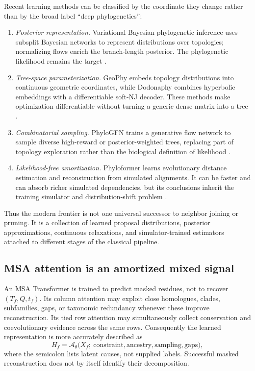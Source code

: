 \documentclass[10pt]{article}
\theoremstyle{definition}
\theoremstyle{remark}
\newcommand{\BookSection}[1]{\subsection{#1}}
\begin{document}
Recent learning methods can be classified by the coordinate they change rather than by the broad
label ``deep phylogenetics'':
\begin{enumerate}
\setlength{\itemsep}{2pt}
\item \emph{Posterior representation.}  Variational Bayesian phylogenetic inference uses
subsplit Bayesian networks to represent distributions over topologies; normalizing flows enrich
the branch-length posterior.  The phylogenetic likelihood remains the target
\cite{zhang2018vbpi,zhang2020flow}.
\item \emph{Tree-space parameterization.}  GeoPhy embeds topology distributions into continuous
geometric coordinates, while Dodonaphy combines hyperbolic embeddings with a differentiable
soft-NJ decoder.  These methods make optimization differentiable without turning a generic dense
matrix into a tree \cite{mimori2023,macaulay2024}.
\item \emph{Combinatorial sampling.}  PhyloGFN trains a generative flow network to sample diverse
high-reward or posterior-weighted trees, replacing part of topology exploration rather than the
biological definition of likelihood \cite{zhou2023phylogfn}.
\item \emph{Likelihood-free amortization.}  Phyloformer learns evolutionary distance estimation
and reconstruction from simulated alignments.  It can be faster and can absorb richer simulated
dependencies, but its conclusions inherit the training simulator and distribution-shift problem
\cite{nesterenko2025phyloformer}.
\end{enumerate}
Thus the modern frontier is not one universal successor to neighbor joining or pruning.  It is a
collection of learned proposal distributions, posterior approximations, continuous relaxations,
and simulator-trained estimators attached to different stages of the classical pipeline.

\BookSection{MSA attention is an amortized mixed signal}

An MSA Transformer is trained to predict masked residues, not to recover $(T_f,Q,t_f)$.  Its column
attention may exploit close homologues, clades, subfamilies, gaps, or taxonomic redundancy whenever
these improve reconstruction.  Its tied row attention may simultaneously collect conservation and
coevolutionary evidence across the same rows.  Consequently the learned representation is more
accurately described as
\begin{equation}
H_f
=\mathcal A_\theta
\bigl(X_f;\ \text{constraint},\text{ancestry},\text{sampling},\text{gaps}\bigr),
\label{eq:msa-mixed-amortization}
\end{equation}
where the semicolon lists latent causes, not supplied labels.  Successful masked reconstruction
does not by itself identify their decomposition.
\end{document}
